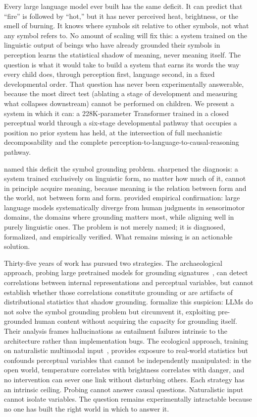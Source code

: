\documentclass{article}
\begin{document}
Every large language model ever built has the same deficit. It can predict that ``fire'' is followed by ``hot,'' but it has never perceived heat, brightness, or the smell of burning. It knows where symbols sit relative to other symbols, not what any symbol refers to. No amount of scaling will fix this: a system trained on the linguistic output of beings who have already grounded their symbols in perception learns the statistical shadow of meaning, never meaning itself. The question is what it would take to build a system that earns its words the way every child does, through perception first, language second, in a fixed developmental order. That question has never been experimentally answerable, because the most direct test (ablating a stage of development and measuring what collapses downstream) cannot be performed on children. We present a system in which it can: a 228K-parameter Transformer trained in a closed perceptual world through a six-stage developmental pathway that occupies a position no prior system has held, at the intersection of full mechanistic decomposability and the complete perception-to-language-to-causal-reasoning pathway.

\citet{harnad1990} named this deficit the symbol grounding problem. \citet{bender2020} sharpened the diagnosis: a system trained exclusively on linguistic form, no matter how much of it, cannot in principle acquire meaning, because meaning is the relation between form and the world, not between form and form. \citet{xu2025} provided empirical confirmation: large language models systematically diverge from human judgments in sensorimotor domains, the domains where grounding matters most, while aligning well in purely linguistic ones. The problem is not merely named; it is diagnosed, formalized, and empirically verified. What remains missing is an actionable solution.

Thirty-five years of work has pursued two strategies. The archaeological approach, probing large pretrained models for grounding signatures~\citep{wu2025,patel2022}, can detect correlations between internal representations and perceptual variables, but cannot establish whether those correlations constitute grounding or are artifacts of distributional statistics that shadow grounding. \citet{floridi2025} formalize this suspicion: LLMs do not solve the symbol grounding problem but circumvent it, exploiting pre-grounded human content without acquiring the capacity for grounding itself. Their analysis frames hallucinations as entailment failures intrinsic to the architecture rather than implementation bugs. The ecological approach, training on naturalistic multimodal input~\citep{vong2024}, provides exposure to real-world statistics but confounds perceptual variables that cannot be independently manipulated: in the open world, temperature correlates with brightness correlates with danger, and no intervention can sever one link without disturbing others. Each strategy has an intrinsic ceiling. Probing cannot answer causal questions. Naturalistic input cannot isolate variables. The question remains experimentally intractable because no one has built the right world in which to answer it.
\end{document}
